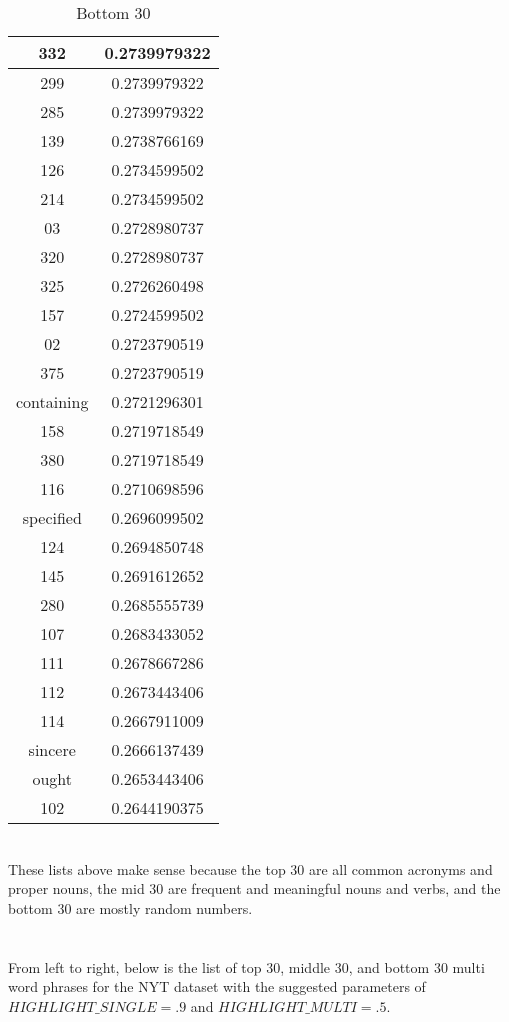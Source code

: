 \documentclass{article}
\begin{document}
\begin{table}[ht]
{\begin{tabular}{|c|c|}
\hline
332 & 0.2739979322 \\
\hline
299 & 0.2739979322 \\
\hline
285 & 0.2739979322 \\
\hline
139 & 0.2738766169 \\
\hline
126 & 0.2734599502 \\
\hline
214 & 0.2734599502 \\
\hline
03 & 0.2728980737 \\
\hline
320 & 0.2728980737 \\
\hline
325 & 0.2726260498 \\
\hline
157 & 0.2724599502 \\
\hline
02 & 0.2723790519 \\
\hline
375 & 0.2723790519 \\
\hline
containing & 0.2721296301 \\
\hline
158 & 0.2719718549 \\
\hline
380 & 0.2719718549 \\
\hline
116 & 0.2710698596 \\
\hline
specified & 0.2696099502 \\
\hline
124 & 0.2694850748 \\
\hline
145 & 0.2691612652 \\
\hline
280 & 0.2685555739 \\
\hline
107 & 0.2683433052 \\
\hline
111 & 0.2678667286 \\
\hline
112 & 0.2673443406 \\
\hline
114 & 0.2667911009 \\
\hline
sincere & 0.2666137439 \\
\hline
ought & 0.2653443406 \\
\hline
102 & 0.2644190375 \\
\hline
\end{tabular}
\caption{Bottom 30}
}
\end{table}\\
These lists above make sense because the top 30 are all common acronyms and proper nouns, the mid 30 are frequent and meaningful nouns and verbs, and the bottom 30 are mostly random numbers.\\\\\\
From left to right, below is the list of top 30, middle 30, and bottom 30 multi word phrases for the NYT dataset with the suggested parameters of $HIGHLIGHT\_SINGLE=.9$ and $HIGHLIGHT\_MULTI=.5$.\\
\end{document}
